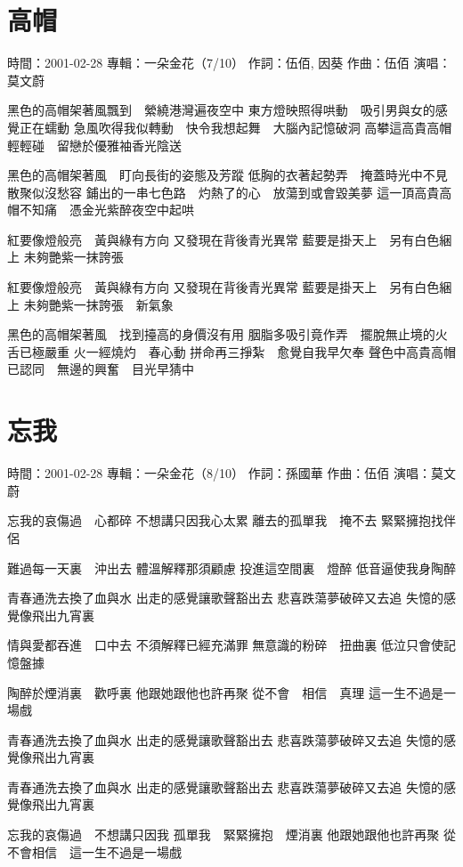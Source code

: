 \documentclass[UTF8,a4paper,oneside,twocolumn,12pt]{ctexbook}
\newcommand{\infopair}[2]{\textbullet #1：#2}
\newcommand{\zc}[1][伍佰]{\infopair{作詞}{#1}}
\newcommand{\zq}[1][伍佰]{\infopair{作曲}{#1}}
\newcommand{\zj}[1]{\infopair{專輯}{#1}}
\newcommand{\sj}[1]{\infopair{時間}{#1}}
\newenvironment{info}{\begin{flushleft}\kaishu
	}
	{\end{flushleft}\normalsize\yahei\par}
\newenvironment{lyric}{
	}
{}
\begin{document}
\section{高帽}
\begin{info}
	\sj{2001-02-28}
	\zj{一朵金花（7/10）}
	\zc[伍佰, 因葵]
	\zq
	\infopair{演唱}{莫文蔚}
\end{info}
\begin{lyric}
	黑色的高帽架著風飄到　縈繞港灣遍夜空中
	東方燈映照得哄動　吸引男與女的感覺正在蠕動
	急風吹得我似轉動　快令我想起舞　大腦內記憶破洞
	高攀這高貴高帽輕輕碰　留戀於優雅袖香光陰送

	黑色的高帽架著風　盯向長街的姿態及芳蹤
	低胸的衣著起勢弄　掩蓋時光中不見散聚似沒愁容
	鋪出的一串七色路　灼熱了的心　放蕩到或會毀美夢
	這一頂高貴高帽不知痛　憑金光紫醉夜空中起哄

	紅要像燈般亮　黃與綠有方向
	又發現在背後青光異常
	藍要是掛天上　另有白色綑上
	未夠艷紫一抹誇張

	紅要像燈般亮　黃與綠有方向
	又發現在背後青光異常
	藍要是掛天上　另有白色綑上
	未夠艷紫一抹誇張　新氣象

	黑色的高帽架著風　找到擡高的身價沒有用
	胭脂多吸引竟作弄　擺脫無止境的火舌已極嚴重
	火一經燒灼　春心動
	拼命再三掙紮　愈覺自我早欠奉
	聲色中高貴高帽已認同　無邊的興奮　目光早猜中

\end{lyric}

\section{忘我}
\begin{info}
	\sj{2001-02-28}
	\zj{一朵金花（8/10）}
	\zc[孫國華]
	\zq
	\infopair{演唱}{莫文蔚}
\end{info}
\begin{lyric}
	忘我的哀傷過　心都碎
	不想講只因我心太累
	離去的孤單我　掩不去
	緊緊擁抱找伴侶

	難過每一天裏　沖出去
	體溫解釋那須顧慮
	投進這空間裏　燈醉
	低音逼使我身陶醉

	青春通洗去換了血與水
	出走的感覺讓歌聲豁出去
	悲喜跌蕩夢破碎又去追
	失憶的感覺像飛出九宵裏

	情與愛都吞進　口中去
	不須解釋已經充滿罪
	無意識的粉碎　扭曲裏
	低泣只會使記憶盤據

	陶醉於煙消裏　歡呼裏
	他跟她跟他也許再聚
	從不會　相信　真理
	這一生不過是一場戲

	青春通洗去換了血與水
	出走的感覺讓歌聲豁出去
	悲喜跌蕩夢破碎又去追
	失憶的感覺像飛出九宵裏

	青春通洗去換了血與水
	出走的感覺讓歌聲豁出去
	悲喜跌蕩夢破碎又去追
	失憶的感覺像飛出九宵裏

	忘我的哀傷過　不想講只因我
	孤單我　緊緊擁抱　煙消裏
	他跟她跟他也許再聚
	從不會相信　這一生不過是一場戲
\end{lyric}
\end{document}
